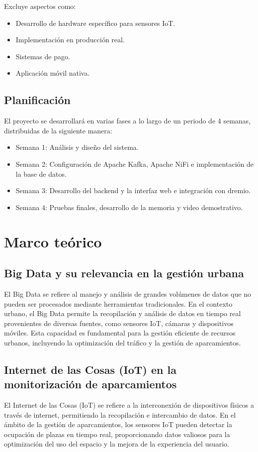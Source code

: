 \documentclass{../../../miPlantilla}
\begin{document}
Excluye aspectos como:
\begin{itemize}
  \item Desarrollo de hardware específico para sensores IoT.
  \item Implementación en producción real.
  \item Sistemas de pago.
  \item Aplicación móvil nativa.
\end{itemize}

\subsection{Planificación}
El proyecto se desarrollará en varias fases a lo largo de un periodo de 4 semanas, distribuidas de la siguiente manera:
\begin{itemize}
  \item Semana 1: Análisis y diseño del sistema.
  \item Semana 2: Configuración de Apache Kafka, Apache NiFi e implementación de la base de datos.
  \item Semana 3: Desarrollo del backend y la interfaz web e integración con dremio.
  \item Semana 4: Pruebas finales, desarrollo de la memoria y video demostrativo.
\end{itemize}

\section{Marco teórico}
\subsection{Big Data y su relevancia en la gestión urbana}
El Big Data se refiere al manejo y análisis de grandes volúmenes de datos que no pueden ser procesados mediante
herramientas tradicionales. En el contexto urbano, el Big Data permite la recopilación y análisis de datos en tiempo real
provenientes de diversas fuentes, como sensores IoT, cámaras y dispositivos móviles. Esta capacidad es fundamental para
la gestión eficiente de recursos urbanos, incluyendo la optimización del tráfico y la gestión de aparcamientos.

\subsection{Internet de las Cosas (IoT) en la monitorización de aparcamientos}
El Internet de las Cosas (IoT) se refiere a la interconexión de dispositivos físicos a través de internet, permitiendo
la recopilación e intercambio de datos. En el ámbito de la gestión de aparcamientos, los sensores IoT pueden detectar la ocupación
de plazas en tiempo real, proporcionando datos valiosos para la optimización del uso del espacio y la mejora de la experiencia del usuario.
\end{document}
